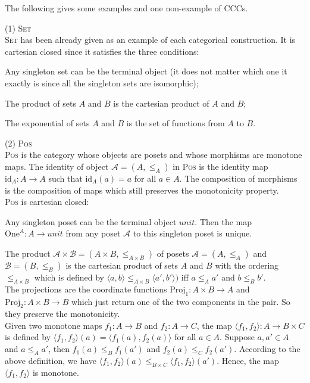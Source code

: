 The following gives some examples and one non-example of CCCs.
\begin{myitemize}
\item[(1)] \textsc{Set}\\
\textsc{Set} has been already given as an example of each categorical construction. It is cartesian closed since it satisfies the three conditions:
  \begin{myitemize}
  \item Any singleton set can be the terminal object (it does not matter which one it exactly is since all the singleton sets are isomorphic);
  \item The product of sets $ A $ and $ B $ is the cartesian product of $ A $ and $ B $;
  \item The exponential of sets $ A $ and $ B $ is the set of functions from $ A $ to $ B $.
  \end{myitemize}
\item[(2)] \textsc{Pos}\\
\textsc{Pos} is the category whose objects are posets and whose morphisms are monotone maps. The identity of object $ \mathcal{A} = (A,\leq _A) $ in \textsc{Pos} is the identity map $ \text{id}_A: A \to A $ such that $ \text{id}_A(a) = a $ for all $ a \in A $. The composition of morphisms is the composition of maps which still preserves the monotonicity property.\\
\textsc{Pos} is cartesian closed:
  \begin{myitemize}
  \item Any singleton poset can be the terminal object $ unit $. Then the map $ \text{One}^A: A \to unit $ from any poset $ \mathcal{A} $ to this singleton poset is unique.
  \item The product $ \mathcal{A} \times \mathcal{B} = (A \times B, \leq_{A \times B}) $ of posets $ \mathcal{A} = (A,\leq _A) $ and $ \mathcal{B} = (B,\leq _B) $ is the cartesian product of sets $ A $ and $ B $ with the ordering $ \leq_{A \times B} $ which is defined by $ \langle a,b \rangle \leq_{A \times B} \langle a',b' \rangle ) $ iff $ a \leq_A a' $ and $ b \leq_B b' $.\\
  The projections are the coordinate functions $ \text{Proj}_1 : A \times B \to A $ and $ \text{Proj}_2 : A \times B \to B $ which just return one of the two components in the pair. So they preserve the monotonicity.\\
  Given two monotone maps $ f_1: A \to B $ and $ f_2: A \to C $, the map $ \langle f_1, f_2 \rangle : A \to B \times C $ is defined by $ \langle f_1, f_2 \rangle (a) = \langle f_1(a), f_2(a) \rangle $ for all $ a \in A $. Suppose $ a,a' \in A $ and $ a \leq_A a' $, then $ f_1(a) \leq_B f_1(a') $ and $ f_2(a) \leq_C f_2(a') $. According to the above definition, we have $ \langle f_1, f_2 \rangle (a) \leq_{B \times C} \langle f_1, f_2 \rangle (a') $. Hence, the map $ \langle f_1, f_2 \rangle $ is monotone.\\

\end{myitemize}
\end{myitemize}
